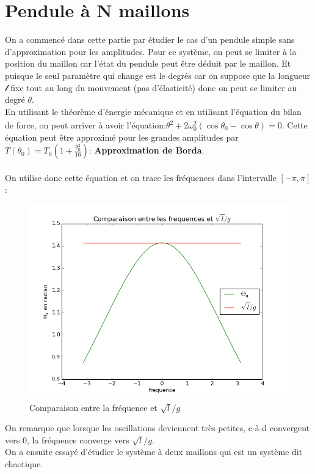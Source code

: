 \documentclass[a4paper,8pt,french,fleqn]{article}
\begin{document}
\section{Pendule à N maillons}

On a commencé dans cette partie par étudier le cas d'un pendule simple sans d'approximation pour les amplitudes.
Pour ce système, on peut se limiter à la position du maillon car l’état du pendule peut être déduit par le maillon. Et puisque le seul paramètre qui change est le degrés car on suppose que la longueur $\mathcal{l}$  fixe tout au long du mouvement (pas d'élasticité) donc on peut se limiter au degré $\theta$.\\

En utilisant le théorème d’énergie mécanique et en utilisant l'équation du bilan de force, on peut arriver à avoir l'équation:$ \dot{\theta^2} + 2 \omega_0^2 ( \cos\theta_0 - \cos\theta) = 0$. Cette équation peut être approximé pour les grandes amplitudes par  $T(\theta_0) = T_0 ( 1 + \frac{\theta_0^2}{16} )$: \textbf{Approximation de Borda}.\\\\
On utilise donc cette équation et on trace les fréquences dans l'intervalle $[-\pi , \pi]$ :
\begin{figure}[h]
\centering
\includegraphics[scale=0.4]{images/un_maillon}
\caption{Comparaison entre la fréquence et $\sqrt{l}/g$}
\end{figure}  
On remarque que lorsque les oscillations deviennent très petites, c-à-d convergent vers 0, la fréquence converge vers $\sqrt{l}/g$.\\
On a ensuite essayé d'étudier le système à deux maillons qui est un système dit chaotique.\\
\end{document}
